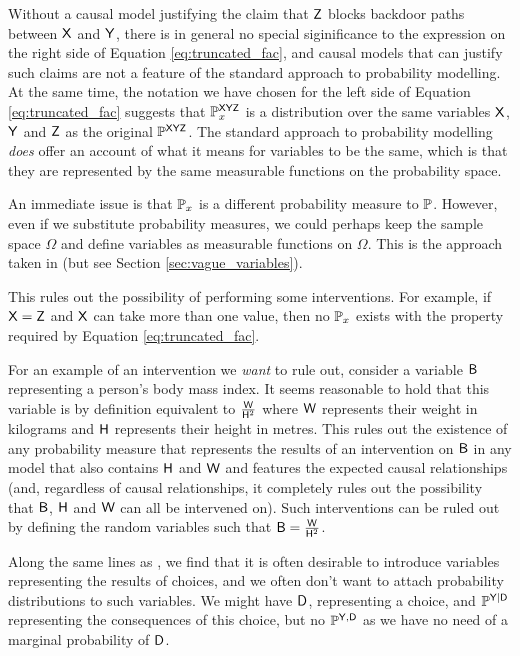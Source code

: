 Without a causal model justifying the claim that $\mathsf{Z}$ blocks backdoor paths between $\mathsf{X}$ and $\mathsf{Y}$, there is in general no special siginificance to the expression on the right side of Equation \ref{eq:truncated_fac}, and causal models that can justify such claims are not a feature of the standard approach to probability modelling. At the same time, the notation we have chosen for the left side of Equation \ref{eq:truncated_fac} suggests that $\mathbb{P}^{\mathsf{XYZ}}_{x}$ is a distribution over the same variables $\mathsf{X}$, $\mathsf{Y}$ and $\mathsf{Z}$ as the original $\mathbb{P}^{\mathsf{XYZ}}$. The standard approach to probability modelling \emph{does} offer an account of what it means for variables to be the same, which is that they are represented by the same measurable functions on the probability space.

An immediate issue is that $\mathbb{P}_x$ is a different probability measure to $\mathbb{P}$. However, even if we substitute probability measures, we could perhaps keep the sample space $\Omega$ and define variables as measurable functions on $\Omega$. This is the approach taken in \citet{pearl_causality:_2009} (but see Section \ref{sec:vague_variables}).

This rules out the possibility of performing some interventions. For example, if $\mathsf{X}=\mathsf{Z}$ and $\mathsf{X}$ can take more than one value, then no $\mathbb{P}_x$ exists with the property required by Equation \ref{eq:truncated_fac}.

For an example of an intervention we \emph{want} to rule out, consider a variable $\mathsf{B}$ representing a person's body mass index. It seems reasonable to hold that this variable is by definition equivalent to $\frac{\mathsf{W}}{\mathsf{H}^2}$ where $\mathsf{W}$ represents their weight in kilograms and $\mathsf{H}$ represents their height in metres. This rules out the existence of any probability measure that represents the results of an intervention on $\mathsf{B}$ in any model that also contains $\mathsf{H}$ and $\mathsf{W}$ and features the expected causal relationships (and, regardless of causal relationships, it completely rules out the possibility that $\mathsf{B}$, $\mathsf{H}$ and $\mathsf{W}$ can all be intervened on). Such interventions can be ruled out by defining the random variables such that $\mathsf{B} = \frac{\mathsf{W}}{\mathsf{H}^2}$.

Along the same lines as \citet{dawid_causal_2000}, we find that it is often desirable to introduce variables representing the results of choices, and we often don't want to attach probability distributions to such variables. We might have $\mathsf{D}$, representing a choice, and $\mathbb{P}^{\mathsf{Y}|\mathsf{D}}$ representing the consequences of this choice, but no $\mathbb{P}^{\mathsf{Y},\mathsf{D}}$ as we have no need of a marginal probability of $\mathsf{D}$.

